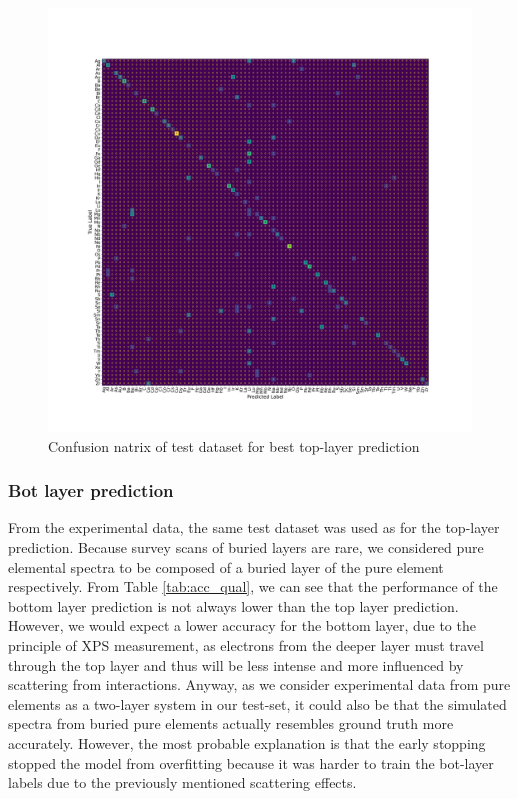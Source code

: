 \begin{center}
\begin{figure}[H]
        \centerline{\includegraphics[width=1.4\textwidth]{Figures/best_task_1_model_CM.png}}
    \centering
    \caption[width=1.4\textwidth]{Confusion natrix of test dataset for best top-layer prediction}
    \label{cm_cnn_1l}
\end{figure}
\end{center}



\subsubsection{Bot layer prediction}


From the experimental data, the same test dataset was used as for the top-layer prediction. Because survey scans of buried layers are rare, we considered pure elemental spectra to be composed of a buried layer of the pure element respectively.
From Table \ref{tab:acc_qual}, we can see that the performance of the bottom layer prediction is not always lower than the top layer prediction. However, we would expect a lower accuracy for the bottom layer, due to the principle of XPS measurement, as electrons from the deeper layer must travel through the top layer and thus will be less intense and more influenced by scattering from interactions. Anyway, as we consider experimental data from pure elements as a two-layer system in our test-set, it could also be that the simulated spectra from buried pure elements actually resembles ground truth more accurately. However, the most probable explanation is that the early stopping stopped the model from overfitting because it was harder to train the bot-layer labels due to the previously mentioned scattering effects.




